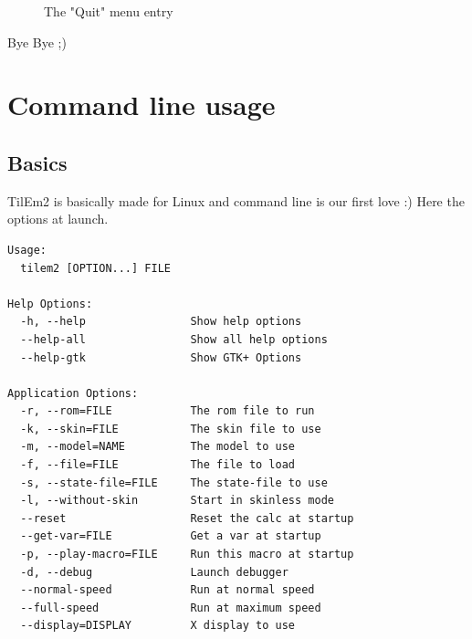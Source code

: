 \documentclass[10pt]{report}
\begin{document}
\begin{figure}[H]
\centering
{}
\caption{The "Quit" menu entry}
\end{figure}
Bye Bye ;)

\chapter{Command line usage}

\section{Basics}
TilEm2 is basically made for Linux and command line is our first love :)\newline
Here the options at launch.\newline
\begin{lstlisting}
Usage:
  tilem2 [OPTION...] FILE

Help Options:
  -h, --help                Show help options
  --help-all                Show all help options
  --help-gtk                Show GTK+ Options

Application Options:
  -r, --rom=FILE            The rom file to run
  -k, --skin=FILE           The skin file to use
  -m, --model=NAME          The model to use
  -f, --file=FILE           The file to load
  -s, --state-file=FILE     The state-file to use
  -l, --without-skin        Start in skinless mode
  --reset                   Reset the calc at startup
  --get-var=FILE            Get a var at startup
  -p, --play-macro=FILE     Run this macro at startup
  -d, --debug               Launch debugger
  --normal-speed            Run at normal speed
  --full-speed              Run at maximum speed
  --display=DISPLAY         X display to use
\end{lstlisting}
\end{document}
